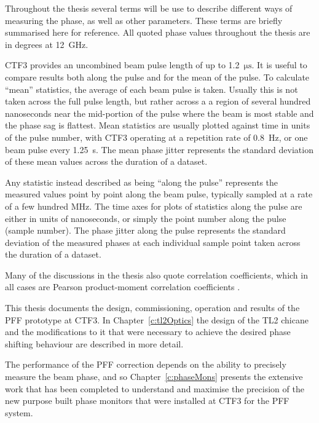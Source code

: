 
Throughout the thesis several terms will be use to describe different ways of measuring the phase, as well as other parameters. These terms are briefly summarised here for reference. All quoted phase values throughout the thesis are in degrees at 12~GHz.

CTF3 provides an uncombined beam pulse length of up to 1.2~\(\mathrm{\mu s}\). It is useful to compare results both along the pulse and for the mean of the pulse. To calculate ``mean'' statistics, the average of each beam pulse is taken. Usually this is not taken across the full pulse length, but rather across a a region of several hundred nanoseconds near the mid-portion of the pulse where the beam is most stable and the phase sag is flattest. Mean statistics are usually plotted against time in units of the pulse number, with CTF3 operating at a repetition rate of 0.8~Hz, or one beam pulse every 1.25~s. The mean phase jitter represents the standard deviation of these mean values across the duration of a dataset.

Any statistic instead described as being ``along the pulse'' represents the measured values point by point along the beam pulse, typically sampled at a rate of a few hundred MHz. The time axes for plots of statistics along the pulse are either in units of nanoseconds, or simply the point number along the pulse (sample number). The phase jitter along the pulse represents the standard deviation of the measured phases at each individual sample point taken across the duration of a dataset.

Many of the discussions in the thesis also quote correlation coefficients, which in all cases are Pearson product-moment correlation coefficients \cite{corrCoeff}.


This thesis documents the design, commissioning, operation and results of the PFF prototype at CTF3. In Chapter~\ref{c:tl2Optics} the design of the TL2 chicane and the modifications to it that were necessary to achieve the desired phase shifting behaviour are described in more detail. 

The performance of the PFF correction depends on the ability to precisely measure the beam phase, and so Chapter~\ref{c:phaseMons} presents the extensive work that has been completed to understand and maximise the precision of the new purpose built phase monitors that were installed at CTF3 for the PFF system. 

